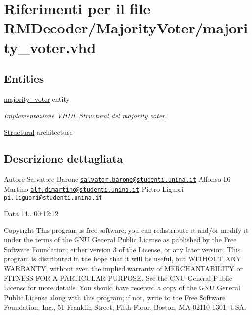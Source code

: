 \hypertarget{majority__voter_8vhd}{\section{Riferimenti per il file R\+M\+Decoder/\+Majority\+Voter/majority\+\_\+voter.vhd}
\label{majority__voter_8vhd}
}
\subsection*{Entities}
\begin{DoxyCompactItemize}
\item 
\hyperlink{classmajority__voter}{majority\+\_\+voter} entity
\begin{DoxyCompactList}\small\item\em Implementazione V\+H\+D\+L \hyperlink{classmajority__voter_1_1_structural}{Structural} del majority voter. \end{DoxyCompactList}\item 
\hyperlink{classmajority__voter_1_1_structural}{Structural} architecture
\end{DoxyCompactItemize}


\subsection{Descrizione dettagliata}
\begin{DoxyAuthor}{Autore}
Salvatore Barone \href{mailto:salvator.barone@studenti.unina.it}{\tt salvator.\+barone@studenti.\+unina.\+it} Alfonso Di Martino \href{mailto:alf.dimartino@studenti.unina.it}{\tt alf.\+dimartino@studenti.\+unina.\+it} Pietro Liguori \href{mailto:pi.liguori@studenti.unina.it}{\tt pi.\+liguori@studenti.\+unina.\+it} 
\end{DoxyAuthor}
\begin{DoxyDate}{Data}
14.. 00\+:12\+:12
\end{DoxyDate}
\begin{DoxyCopyright}{Copyright}
This program is free software; you can redistribute it and/or modify it under the terms of the G\+N\+U General Public License as published by the Free Software Foundation; either version 3 of the License, or any later version. This program is distributed in the hope that it will be useful, but W\+I\+T\+H\+O\+U\+T A\+N\+Y W\+A\+R\+R\+A\+N\+T\+Y; without even the implied warranty of M\+E\+R\+C\+H\+A\+N\+T\+A\+B\+I\+L\+I\+T\+Y or F\+I\+T\+N\+E\+S\+S F\+O\+R A P\+A\+R\+T\+I\+C\+U\+L\+A\+R P\+U\+R\+P\+O\+S\+E. See the G\+N\+U General Public License for more details. You should have received a copy of the G\+N\+U General Public License along with this program; if not, write to the Free Software Foundation, Inc., 51 Franklin Street, Fifth Floor, Boston, M\+A 02110-\/1301, U\+S\+A. 
\end{DoxyCopyright}
